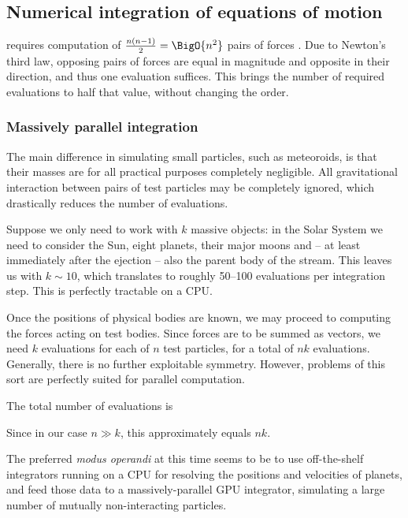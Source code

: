     \subsection{Numerical integration of equations of motion} \label{asi}
        requires computation of $\frac{n\left(n - 1\right)}{2} = \BigO{n^2}$ pairs of forces \cite{...}.
        Due to Newton's third law, opposing pairs of forces are equal in magnitude and opposite in their direction,
        and thus one evaluation suffices. This brings the number of required evaluations to half that value,
        without changing the order.


        \subsubsection{Massively parallel integration} \label{asip}
            The main difference in simulating small particles, such as meteoroids,
            is that their masses are for all practical purposes completely negligible.
            All gravitational interaction between pairs of test particles may be completely ignored,
            which drastically reduces the number of evaluations.

            Suppose we only need to work with $k$ massive objects:
            in the Solar System we need to consider the Sun, eight planets, their major moons
            and -- at least immediately after the ejection -- also the parent body of the stream.
            This leaves us with $k \sim 10$, which translates to roughly 50--100 evaluations per integration step.
            This is perfectly tractable on a CPU.

            Once the positions of physical bodies are known, we may proceed to computing the forces acting
            on test bodies. Since forces are to be summed as vectors, we need $k$ evaluations
            for each of $n$ test particles, for a total of $nk$ evaluations.
            Generally, there is no further exploitable symmetry.
            However, problems of this sort are perfectly suited for parallel computation.

            The total number of evaluations is

            Since in our case $n \gg k$, this approximately equals $nk$.

            The preferred \textit{modus operandi} at this time seems to be to use off-the-shelf integrators
            running on a CPU for resolving the positions and velocities of planets, and feed those data
            to a massively-parallel GPU integrator, simulating a large number of mutually non-interacting particles.

